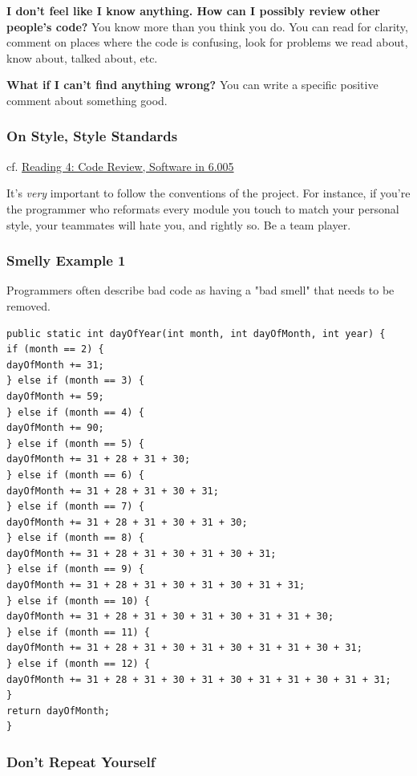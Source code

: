 \documentclass[10pt]{amsart}
\begin{document}
\textbf{I don't feel like I know anything. How can I possibly review other people's code?} You know more than you think you do. You can read for clarity, comment on places where the code is confusing, look for problems we read about, know about, talked about, etc.

\textbf{What if I can't find anything wrong?} You can write a specific positive comment about something good.


\subsubsection{On Style, Style Standards}

cf. \href{https://ocw.mit.edu/ans7870/6/6.005/s16/classes/04-code-review/index.html}{Reading 4: Code Review, Software in 6.005}

It's \emph{very} important to follow the conventions of the project. For instance, if you're the programmer who reformats every module you touch to match your personal style, your teammates will hate you, and rightly so. Be a team player.

\subsubsection{Smelly Example 1}

Programmers often describe bad code as having a "bad smell" that needs to be removed.

\begin{verbatim}
public static int dayOfYear(int month, int dayOfMonth, int year) {
if (month == 2) {
dayOfMonth += 31;
} else if (month == 3) {
dayOfMonth += 59;
} else if (month == 4) {
dayOfMonth += 90;
} else if (month == 5) {
dayOfMonth += 31 + 28 + 31 + 30;
} else if (month == 6) {
dayOfMonth += 31 + 28 + 31 + 30 + 31;
} else if (month == 7) {
dayOfMonth += 31 + 28 + 31 + 30 + 31 + 30;
} else if (month == 8) {
dayOfMonth += 31 + 28 + 31 + 30 + 31 + 30 + 31;
} else if (month == 9) {
dayOfMonth += 31 + 28 + 31 + 30 + 31 + 30 + 31 + 31;
} else if (month == 10) {
dayOfMonth += 31 + 28 + 31 + 30 + 31 + 30 + 31 + 31 + 30;
} else if (month == 11) {
dayOfMonth += 31 + 28 + 31 + 30 + 31 + 30 + 31 + 31 + 30 + 31;
} else if (month == 12) {
dayOfMonth += 31 + 28 + 31 + 30 + 31 + 30 + 31 + 31 + 30 + 31 + 31;
}
return dayOfMonth;
}
\end{verbatim}

\subsubsection{Don't Repeat Yourself}
\end{document}
